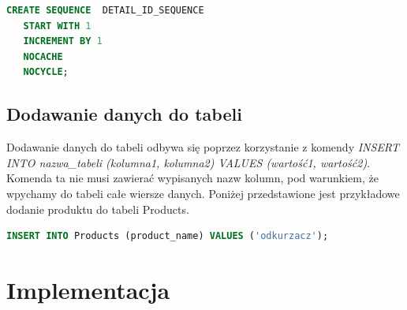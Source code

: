\documentclass{article}
\begin{document}
\begin{lstlisting}[language=SQL,frame=single]
   CREATE SEQUENCE  DETAIL_ID_SEQUENCE 
   START WITH 1
   INCREMENT BY 1
   NOCACHE
   NOCYCLE;
 \end{lstlisting}

\subsection{Dodawanie danych do tabeli}
Dodawanie danych do tabeli odbywa się poprzez korzystanie z komendy
\textit{INSERT INTO nazwa\_tabeli (kolumna1, kolumna2) VALUES
   (wartość1, wartość2)}. Komenda ta nie musi zawierać wypisanych nazw kolumn, pod
warunkiem, że wpychamy do tabeli całe wiersze danych.
Poniżej przedstawione jest przykładowe dodanie produktu do tabeli Products.

\begin{lstlisting}[language=SQL,frame=single]
INSERT INTO Products (product_name) VALUES ('odkurzacz');
 \end{lstlisting}

\section{Implementacja}
\end{document}
